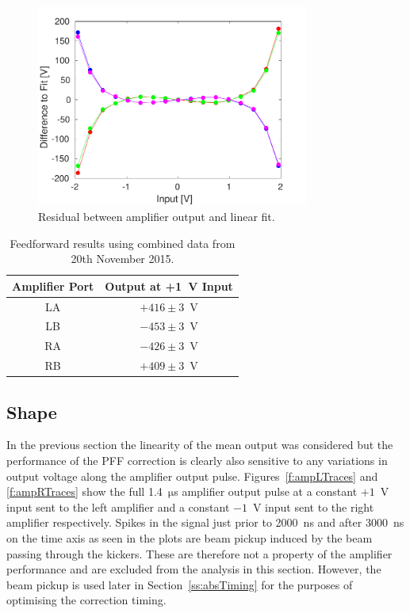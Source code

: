 \begin{figure}
  \centering
  \includegraphics[width=0.8\textwidth]{Figures/commissioning/AmpOutvsDAC_residual}
  \caption{Residual between amplifier output and linear fit.}
  \label{f:AmpOutvsDAC_residual}
\end{figure}

\begin{table}
  \begin{center}
    \begin{tabular}{| c | c |}
	   \hline
       Amplifier Port & Output at +1~V Input \\ \hline
       LA & \(+416\pm3\)~V \\
	   LB & \(-453\pm3\)~V \\
	   RA & \(-426\pm3\)~V \\
	   RB & \(+409\pm3\)~V \\
 	   \hline
    \end{tabular}
    \caption{Feedforward results using combined data from 20th November 2015.}
  	\label{t:AmpOutVsDAC}
  \end{center}
\end{table}

\subsection{Shape}
\label{ss:ampShape}

In the previous section the linearity of the mean output was considered but the performance of the PFF correction is clearly also sensitive to any variations in output voltage along the amplifier output pulse. Figures~\ref{f:ampLTraces} and \ref{f:ampRTraces} show the full 1.4~\(\mathrm{\mu}\)s amplifier output pulse at a constant \(+1\)~V input sent to the left amplifier and a constant \(-1\)~V input sent to the right amplifier respectively. Spikes in the signal just prior to 2000~ns and after 3000~ns on the time axis as seen in the plots are beam pickup induced by the beam passing through the kickers. These are therefore not a property of the amplifier performance and are excluded from the analysis in this section. However, the beam pickup is used later in Section~\ref{ss:absTiming} for the purposes of optimising the correction timing.


